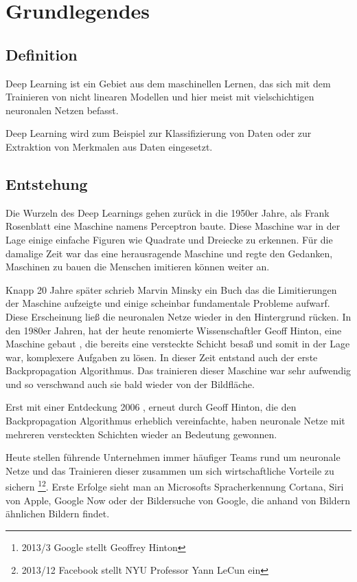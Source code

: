 \chapter{Grundlegendes}
\label{cha:grundlegendes}

\section{Definition}

Deep Learning ist ein Gebiet aus dem maschinellen Lernen, das sich mit dem Trainieren von nicht linearen Modellen und hier meist mit vielschichtigen neuronalen Netzen befasst. 

Deep Learning wird zum Beispiel zur Klassifizierung von Daten oder zur Extraktion von Merkmalen aus Daten eingesetzt.

\section{Entstehung}

Die Wurzeln des Deep Learnings gehen zurück in die 1950er Jahre, als Frank Rosenblatt eine Maschine namens Perceptron \citep{Perceptron} baute. Diese Maschine war in der Lage einige einfache Figuren wie Quadrate und Dreiecke zu erkennen. Für die damalige Zeit war das eine herausragende Maschine und regte den Gedanken, Maschinen zu bauen die Menschen imitieren können weiter an.

Knapp 20 Jahre später schrieb Marvin Minsky \citep{PerceptronsMinsky} ein Buch das die Limitierungen der Maschine aufzeigte und einige scheinbar fundamentale Probleme aufwarf. Diese Erscheinung ließ die neuronalen Netze wieder in den Hintergrund rücken.
In den 1980er Jahren, hat der heute renomierte Wissenschaftler Geoff Hinton, eine Maschine gebaut \citep{BackpropagationEarly}, die bereits eine versteckte Schicht besaß und somit in der Lage war, komplexere Aufgaben zu lösen. In dieser Zeit entstand auch der erste Backpropagation Algorithmus. %
Das trainieren dieser Maschine war sehr aufwendig und so verschwand auch sie bald wieder von der Bildfläche. 

Erst mit einer Entdeckung 2006 \citep{BackpropagationFast}, erneut durch Geoff Hinton, die den Backpropagation Algorithmus erheblich vereinfachte, haben neuronale Netze mit mehreren versteckten Schichten wieder an Bedeutung gewonnen. 

Heute stellen führende Unternehmen immer häufiger Teams rund um neuronale Netze und das Trainieren dieser zusammen um sich wirtschaftliche Vorteile zu sichern \footnote{2013/3 Google stellt Geoffrey Hinton}\footnote{2013/12 Facebook stellt NYU Professor Yann LeCun ein}. Erste Erfolge sieht man an Microsofts Spracherkennung Cortana, Siri von Apple, Google Now oder der Bildersuche von Google, die anhand von Bildern ähnlichen Bildern findet.


